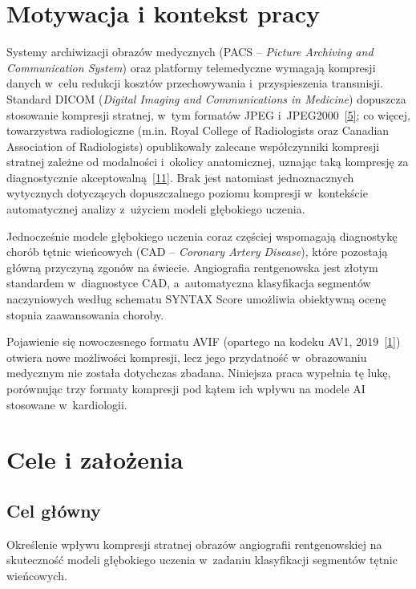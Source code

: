 \documentclass[12pt,a4paper]{article}
\newcommand{\mycite}[1]{\hyperlink{bib#1}{[#1]}}
\begin{document}
\clearpage
\section{Motywacja i kontekst pracy}

Systemy archiwizacji obrazów medycznych (PACS -- \textit{Picture Archiving and Communication System}) oraz platformy telemedyczne wymagają kompresji danych w~celu redukcji kosztów przechowywania i~przyspieszenia transmisji. Standard DICOM (\textit{Digital Imaging and Communications in Medicine}) dopuszcza stosowanie kompresji stratnej, w~tym formatów JPEG i~JPEG2000~\mycite{5}; co więcej, towarzystwa radiologiczne (m.in. Royal College of Radiologists oraz Canadian Association of Radiologists) opublikowały zalecane współczynniki kompresji stratnej zależne od modalności i~okolicy anatomicznej, uznając taką kompresję za diagnostycznie akceptowalną~\mycite{11}. Brak jest natomiast jednoznacznych wytycznych dotyczących dopuszczalnego poziomu kompresji w~kontekście automatycznej analizy z~użyciem modeli głębokiego uczenia.

Jednocześnie modele głębokiego uczenia coraz częściej wspomagają diagnostykę chorób tętnic wieńcowych (CAD -- \textit{Coronary Artery Disease}), które pozostają główną przyczyną zgonów na świecie. Angiografia rentgenowska jest złotym standardem w~diagnostyce CAD, a~automatyczna klasyfikacja segmentów naczyniowych według schematu SYNTAX Score umożliwia obiektywną ocenę stopnia zaawansowania choroby.

Pojawienie się nowoczesnego formatu AVIF (opartego na kodeku AV1, 2019~\mycite{1}) otwiera nowe możliwości kompresji, lecz jego przydatność w~obrazowaniu medycznym nie została dotychczas zbadana. Niniejsza praca wypełnia tę lukę, porównując trzy formaty kompresji pod kątem ich wpływu na modele AI stosowane w~kardiologii.

\clearpage
\section{Cele i założenia}

\subsection{Cel główny}
Określenie wpływu kompresji stratnej obrazów angiografii rentgenowskiej na skuteczność modeli głębokiego uczenia w~zadaniu klasyfikacji segmentów tętnic wieńcowych.
\end{document}
